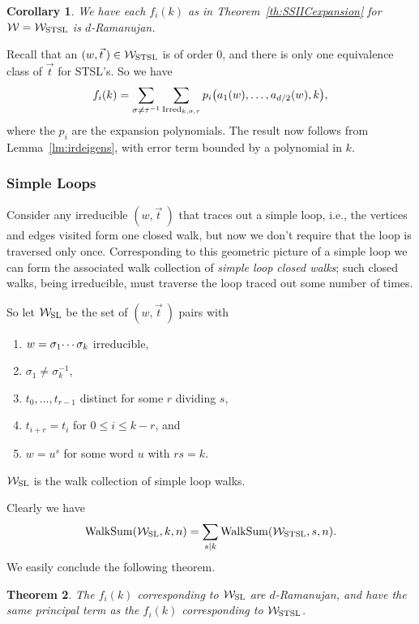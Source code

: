 \documentclass[12pt]{article}
\newtheorem{theorem}{Theorem}[section]
\newtheorem{corollary}[theorem]{Corollary}
\newcommand{\dtreelike}{{$d$-Ramanujan}}
\newcommand{\walksum}[2]{{{\rm WalkSum}(#1,#2)}}
\newcommand{\cw}{{\cal W}}
\newcommand{\cwstsl}{{\cw_{\rm STSL}}}
\newcommand{\cwsl}{{\cw_{\rm SL}}}
\newcommand{\proof}{{\par\noindent {\bf Proof}\space\space}}
\newcommand{\ird}[1]{{\rm Irred}_{#1}}
\begin{document}
\begin{corollary}
\label{cr:stsl_dtreelike}
We have each $f_i(k)$ as in Theorem~\ref{th:SSIICexpansion}
for ${\cal W}=\cwstsl$
is {\dtreelike}.
\end{corollary}
\proof 
Recall that an $(w,\vec t\>)\in\cwstsl$ is of order $0$, and there is only
one equivalence class of $\vec t$ for STSL's.
So we have
$$
f_i(k)=\sum_{\sigma\ne\tau^{-1}} \sum_{\ird{k,\sigma,\tau}}
p_i\bigl( a_1(w),\ldots,a_{d/2}(w),k\bigr),
$$
where the $p_i$ are the expansion polynomials.
The result now follows from Lemma~\ref{lm:irdeigens}, with error term
bounded by a polynomial in $k$.


\subsubsection{Simple Loops}

Consider any irreducible $(w,\vec t\>)$ that traces out a simple loop,
i.e., the vertices and edges visited form one closed walk, but now we don't
require that the loop is traversed only once.
Corresponding to this geometric picture of a simple loop we can form
the associated walk collection of {\em simple loop closed walks}; such closed walks,
being irreducible, must traverse the loop traced out some number of
times.

So let $\cwsl$ be the set of $(w,\vec t\>)$ pairs with 
\begin{enumerate}
\item $w=\sigma_1\raise1.6pt\hbox{\ldots}\sigma_k$ irreducible,
\item $\sigma_1\ne\sigma_k^{-1}$,
\item $t_0,\ldots,t_{r-1}$
distinct for some $r$ dividing $s$,
\item $t_{i+r}=t_i$ for $0\le i\le k-r$, and 
\item $w=u^s$ for some word $u$
with $rs=k$.
\end{enumerate}
$\cwsl$ is the walk collection of simple loop walks.

Clearly we have
\begin{equation}\label{eq:multiply_traversed}
\walksum{\cwsl}{k,n}=\sum_{s|k} \walksum{\cwstsl}{s,n}.
\end{equation}
We easily conclude the following theorem.
\begin{theorem} The $f_i(k)$ corresponding to $\cwsl$ are {\dtreelike},
and have the same principal term as the $f_i(k)$ corresponding to
$\cwstsl$.
\end{theorem}
\end{document}
